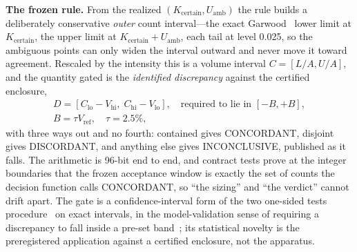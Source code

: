 \textbf{The frozen rule.} From the realized
$(K_{\mathrm{certain}}, U_{\mathrm{amb}})$ the rule builds a deliberately
conservative \emph{outer} count interval---the exact
Garwood~\cite{garwood1936} lower limit at
$K_{\mathrm{certain}}$, the upper limit at
$K_{\mathrm{certain}} + U_{\mathrm{amb}}$, each tail at level 0.025, so the
ambiguous points can only widen the interval outward and never move it
toward agreement. Rescaled by the intensity this is a volume interval
$C = [L/A, U/A]$, and the quantity gated is the \emph{identified
discrepancy} against the certified enclosure,
\begin{equation}
\begin{array}{c}
D = [C_{\mathrm{lo}} - V_{\mathrm{hi}},\; C_{\mathrm{hi}} - V_{\mathrm{lo}}],
\quad \mbox{required to lie in } [-B, +B],\\[2pt]
B = \tau V_{\mathrm{ref}}, \quad \tau = 2.5\%,
\end{array}
\end{equation}
with three ways out and no fourth: contained gives CONCORDANT, disjoint
gives DISCORDANT, and anything else gives INCONCLUSIVE, published as it
falls. The arithmetic is 96-bit end to end, and contract tests prove at the
integer boundaries that the frozen acceptance window is exactly the set of
counts the decision function calls CONCORDANT, so ``the sizing'' and ``the
verdict'' cannot drift apart. The gate is a confidence-interval form of
the two one-sided tests procedure~\cite{schuirmann1987,lakens2017} on exact
intervals, in the model-validation sense of requiring a discrepancy to fall
inside a pre-set band~\cite{robinsonfroese2004}; its statistical novelty is
the preregistered application against a certified enclosure, not the
apparatus.

